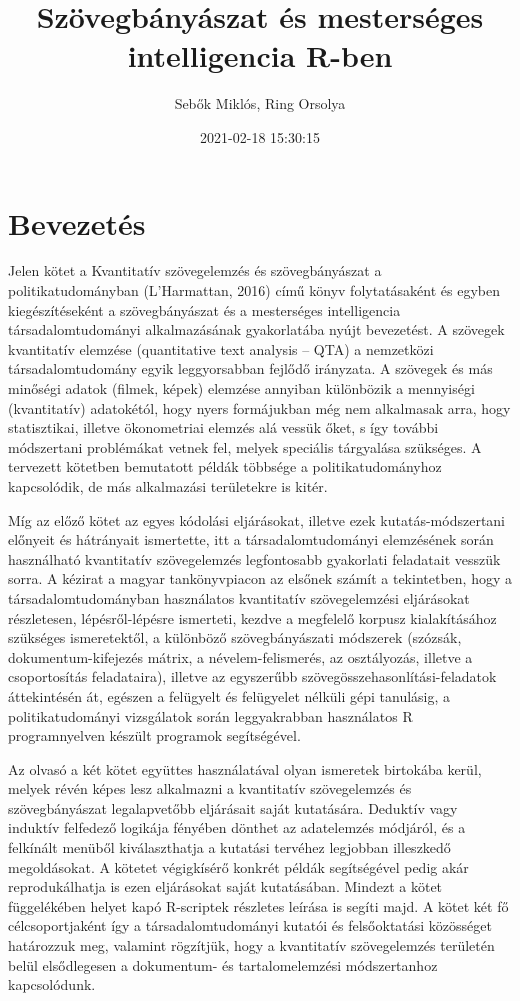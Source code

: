 \documentclass[
]{book}
\title{Szövegbányászat és mesterséges intelligencia R-ben}
\author{Sebők Miklós, Ring Orsolya}
\date{2021-02-18 15:30:15}
\begin{document}
\frontmatter
\maketitle

\mainmatter
\hypertarget{bevezetuxe9s}{%
\chapter{Bevezetés}\label{bevezetuxe9s}}

Jelen kötet a Kvantitatív szövegelemzés és szövegbányászat a
politikatudományban (L'Harmattan, 2016) című könyv folytatásaként és
egyben kiegészítéseként a szövegbányászat és a mesterséges intelligencia
társadalomtudományi alkalmazásának gyakorlatába nyújt bevezetést. A
szövegek kvantitatív elemzése (quantitative text analysis -- QTA) a
nemzetközi társadalomtudomány egyik leggyorsabban fejlődő irányzata. A
szövegek és más minőségi adatok (filmek, képek) elemzése annyiban
különbözik a mennyiségi (kvantitatív) adatokétól, hogy nyers formájukban
még nem alkalmasak arra, hogy statisztikai, illetve ökonometriai elemzés
alá vessük őket, s így további módszertani problémákat vetnek fel,
melyek speciális tárgyalása szükséges. A tervezett kötetben bemutatott
példák többsége a politikatudományhoz kapcsolódik, de más alkalmazási
területekre is kitér.

Míg az előző kötet az egyes kódolási eljárásokat, illetve ezek
kutatás-módszertani előnyeit és hátrányait ismertette, itt a
társadalomtudományi elemzésének során használható kvantitatív
szövegelemzés legfontosabb gyakorlati feladatait vesszük sorra. A
kézirat a magyar tankönyvpiacon az elsőnek számít a tekintetben, hogy a
társadalomtudományban használatos kvantitatív szövegelemzési eljárásokat
részletesen, lépésről-lépésre ismerteti, kezdve a megfelelő korpusz
kialakításához szükséges ismeretektől, a különböző szövegbányászati
módszerek (szózsák, dokumentum-kifejezés mátrix, a névelem-felismerés,
az osztályozás, illetve a csoportosítás feladataira), illetve az
egyszerűbb szövegösszehasonlítási-feladatok áttekintésén át, egészen a
felügyelt és felügyelet nélküli gépi tanulásig, a politikatudományi
vizsgálatok során leggyakrabban használatos R programnyelven készült
programok segítségével.

Az olvasó a két kötet együttes használatával olyan ismeretek birtokába
kerül, melyek révén képes lesz alkalmazni a kvantitatív szövegelemzés és
szövegbányászat legalapvetőbb eljárásait saját kutatására. Deduktív vagy
induktív felfedező logikája fényében dönthet az adatelemzés módjáról, és
a felkínált menüből kiválaszthatja a kutatási tervéhez legjobban
illeszkedő megoldásokat. A kötetet végigkísérő konkrét példák
segítségével pedig akár reprodukálhatja is ezen eljárásokat saját
kutatásában. Mindezt a kötet függelékében helyet kapó R-scriptek
részletes leírása is segíti majd. A kötet két fő célcsoportjaként így a
társadalomtudományi kutatói és felsőoktatási közösséget határozzuk meg,
valamint rögzítjük, hogy a kvantitatív szövegelemzés területén belül
elsődlegesen a dokumentum- és tartalomelemzési módszertanhoz
kapcsolódunk.
\end{document}
